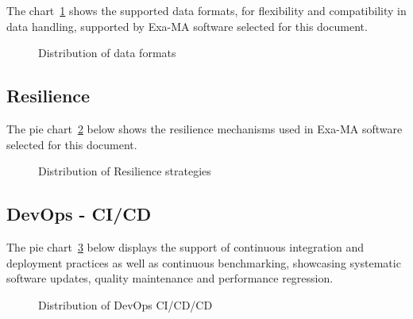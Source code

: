 The chart~\ref{fig:data} shows the supported data formats, for flexibility and compatibility in data handling, supported by Exa-MA software selected for this document.

\begin{figure}[H]
\centering
{}
\caption{Distribution of data formats}
\label{fig:data}
\end{figure}


\subsection{Resilience}

The pie chart~\ref{fig:resilience} below shows the resilience mechanisms used in Exa-MA software selected for this document.

\begin{figure}[H]
\centering
{}
\caption{Distribution of Resilience strategies}
\label{fig:resilience}
\end{figure}



\subsection{DevOps - CI/CD}

The pie chart~\ref{fig:devops-cicd} below displays the support of continuous integration and deployment practices as well as continuous benchmarking, showcasing systematic software updates, quality maintenance and performance regression.

\begin{figure}[H]
\centering
{}
\caption{Distribution of DevOps CI/CD/CD}
\label{fig:devops-cicd}
\end{figure}



